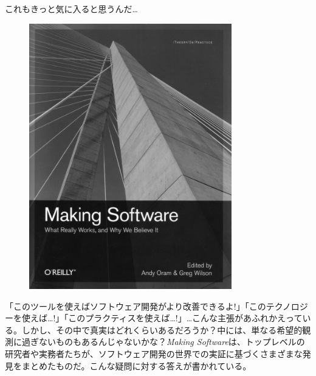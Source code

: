 
\thispagestyle{empty}

\sffamily

\Large これもきっと気に入ると思うんだ\ldots

\normalsize

\begin{figure}[h!]
\centering
\includegraphics[width=250pt]{../images/backmatter/making.pdf}
\end{figure}

「このツールを使えばソフトウェア開発がより改善できるよ!」「このテクノロジーを使えば…!」「このプラクティスを使えば…!」…こんな主張があふれかえっている。しかし、その中で真実はどれくらいあるだろうか？中には、単なる希望的観測に過ぎないものもあるんじゃないかな？\emph{Making Software}は、トップレベルの研究者や実務者たちが、ソフトウェア開発の世界での実証に基づくさまざまな発見をまとめたものだ。こんな疑問に対する答えが書かれている。

\vspace{-0.1cm}

